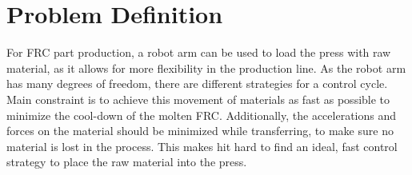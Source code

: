 \chapter{Problem Definition}

For \ac{FRC} part production, a robot arm can be used to load the press with raw material, as it allows for more flexibility in the production line.
As the robot arm has many degrees of freedom, there are different strategies for a control cycle. 
Main constraint is to achieve this movement of materials as fast as possible to minimize the cool-down of the molten \ac{FRC}. 
Additionally, the accelerations and forces on the material should be minimized while transferring, to make sure no material is lost in the process.
This makes hit hard to find an ideal, fast control strategy to place the raw material into the press.


